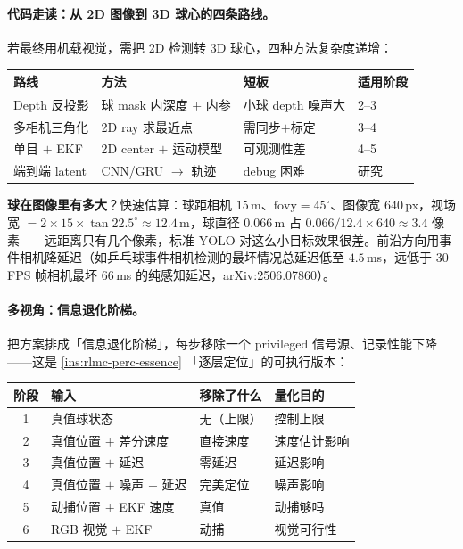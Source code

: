 \paragraph{代码走读：从 2D 图像到 3D 球心的四条路线。}若最终用机载视觉，需把 2D 检测转 3D 球心，四种方法复杂度递增：

\begin{center}
\small
\begin{tabular}{@{}llll@{}}
\toprule
路线 & 方法 & 短板 & 适用阶段 \\
\midrule
Depth 反投影 & 球 mask 内深度 $+$ 内参 & 小球 depth 噪声大 & 2--3 \\
多相机三角化 & 2D ray 求最近点 & 需同步$+$标定 & 3--4 \\
单目 $+$ EKF & 2D center $+$ 运动模型 & 可观测性差 & 4--5 \\
端到端 latent & CNN/GRU $\to$ 轨迹 & debug 困难 & 研究 \\
\bottomrule
\end{tabular}
\end{center}

\textbf{球在图像里有多大}？快速估算：球距相机 $15$\,m、$\mathrm{fovy}=45^\circ$、图像宽 $640$\,px，视场宽 $=2\times 15\times\tan 22.5^\circ\approx 12.4$\,m，球直径 $0.066$\,m 占 $0.066/12.4\times 640\approx 3.4$ 像素——远距离只有几个像素，标准 YOLO 对这么小目标效果很差。前沿方向用事件相机降延迟（如乒乓球事件相机检测的最坏情况总延迟低至 $4.5$\,ms，远低于 $30$\,FPS 帧相机最坏 $66$\,ms 的纯感知延迟，arXiv:2506.07860）。

\paragraph{多视角：信息退化阶梯。}把方案排成「信息退化阶梯」，每步移除一个 privileged 信号源、记录性能下降——这是 \cref{ins:rlmc-perc-essence} 「逐层定位」的可执行版本：

\begin{center}
\small
\begin{tabular}{@{}clll@{}}
\toprule
阶段 & 输入 & 移除了什么 & 量化目的 \\
\midrule
1 & 真值球状态 & 无（上限） & 控制上限 \\
2 & 真值位置 $+$ 差分速度 & 直接速度 & 速度估计影响 \\
3 & 真值位置 $+$ 延迟 & 零延迟 & 延迟影响 \\
4 & 真值位置 $+$ 噪声 $+$ 延迟 & 完美定位 & 噪声影响 \\
5 & 动捕位置 $+$ EKF 速度 & 真值 & 动捕够吗 \\
6 & RGB 视觉 $+$ EKF & 动捕 & 视觉可行性 \\
\bottomrule
\end{tabular}
\end{center}


